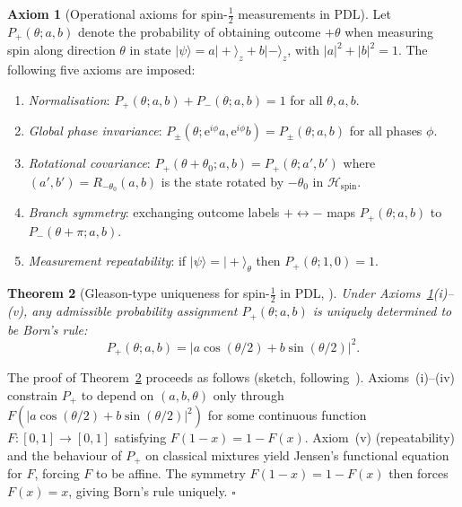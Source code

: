 \documentclass[11pt,a4paper]{article}
\newtheorem{theorem}{Theorem}[section]
\theoremstyle{definition}
\newtheorem{axiom}[theorem]{Axiom}
\newcommand{\PDL}{\textnormal{PDL}}
\newcommand{\Hspin}{\mathcal{H}_{\mathrm{spin}}}
\newcommand{\pket}[1]{|#1\rangle}
\begin{document}
\begin{axiom}[Operational axioms for spin-$\tfrac{1}{2}$ measurements in \PDL]
\label{ax:five}
Let $P_+(\theta;a,b)$ denote the probability of obtaining outcome $+\theta$ when measuring spin along direction $\theta$ in state $\pket{\psi} = a\pket{+}_z + b\pket{-}_z$, with $|a|^2+|b|^2 = 1$. The following five axioms are imposed:
\begin{enumerate}[label=(\roman*)]
\item \emph{Normalisation}: $P_+(\theta;a,b) + P_-(\theta;a,b) = 1$ for all $\theta, a, b$.
\item \emph{Global phase invariance}: $P_\pm(\theta;\mathrm{e}^{i\phi}a,\mathrm{e}^{i\phi}b) = P_\pm(\theta;a,b)$ for all phases $\phi$.
\item \emph{Rotational covariance}: $P_+(\theta+\theta_0;a,b) = P_+(\theta;a',b')$ where $(a',b') = R_{-\theta_0}(a,b)$ is the state rotated by $-\theta_0$ in $\Hspin$.
\item \emph{Branch symmetry}: exchanging outcome labels $+\leftrightarrow -$ maps $P_+(\theta;a,b)$ to $P_-(\theta+\pi;a,b)$.
\item \emph{Measurement repeatability}: if $\pket{\psi} = \pket{+}_\theta$ then $P_+(\theta;1,0) = 1$.
\end{enumerate}
\end{axiom}

\begin{theorem}[Gleason-type uniqueness for spin-$\tfrac{1}{2}$ in \PDL, \cite{Gleason_PDL_2026}]
\label{thm:gleason}
Under Axioms~\ref{ax:five}(i)--(v), any admissible probability assignment $P_+(\theta;a,b)$ is uniquely determined to be Born's rule:
\begin{equation}
P_+(\theta;a,b) = \bigl|a\cos(\theta/2) + b\sin(\theta/2)\bigr|^2.
\label{eq:born_unique}
\end{equation}
\end{theorem}

The proof of Theorem~\ref{thm:gleason} proceeds as follows (sketch, following~\cite{Gleason_PDL_2026}). Axioms~(i)--(iv) constrain $P_+$ to depend on $(a,b,\theta)$ only through $F(|a\cos(\theta/2)+b\sin(\theta/2)|^2)$ for some continuous function $F:[0,1]\to[0,1]$ satisfying $F(1-x) = 1-F(x)$. Axiom~(v) (repeatability) and the behaviour of $P_+$ on classical mixtures yield Jensen's functional equation for $F$, forcing $F$ to be affine. The symmetry $F(1-x)=1-F(x)$ then forces $F(x) = x$, giving Born's rule uniquely. $\square$

\end{document}

